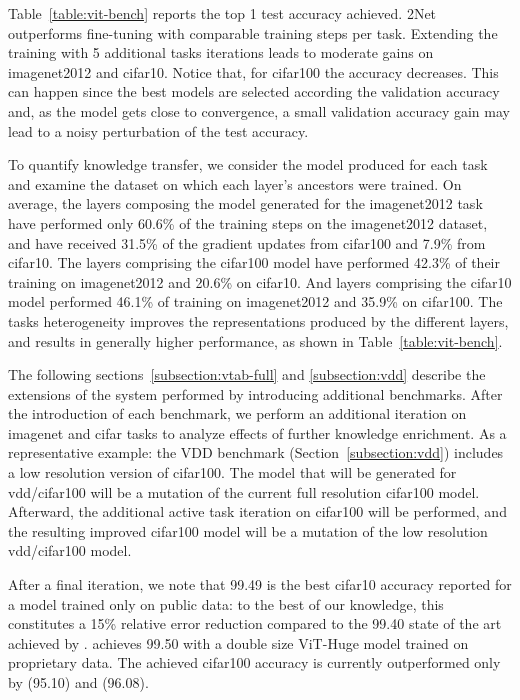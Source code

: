 \documentclass{article} \usepackage{iclr2023_conference,times}
\newcommand{\muNet}{2Net\xspace}
\begin{document}
Table~\ref{table:vit-bench} reports the top 1 test accuracy achieved. \muNet outperforms fine-tuning with comparable training steps per task.
Extending the training with 5 additional tasks iterations leads to moderate gains on imagenet2012 and cifar10.
Notice that, for cifar100 the accuracy decreases.
This can happen since the best models are selected according the  validation accuracy and, as the model gets close to convergence, a small validation accuracy gain may lead to a noisy perturbation of the test accuracy.

To quantify knowledge transfer, we consider the model produced for each task and examine the dataset on which each layer's ancestors were trained.
On average, the layers composing the model generated for the imagenet2012 task have performed only 60.6\% of the training steps on the imagenet2012 dataset,
and have received 31.5\% of the gradient updates from cifar100 and 7.9\% from cifar10.
The layers comprising the cifar100 model have performed 42.3\% of their training on imagenet2012 and 20.6\% on cifar10.
And layers comprising the cifar10 model performed 46.1\% of training on imagenet2012 and 35.9\% on cifar100.
The tasks heterogeneity improves the representations produced by the different layers, and results in generally higher performance, as shown in Table~\ref{table:vit-bench}.

The following sections~\ref{subsection:vtab-full} and \ref{subsection:vdd} describe the extensions of the system performed by introducing additional benchmarks.
After the introduction of each benchmark, we perform an additional iteration on imagenet and cifar tasks to analyze effects of further knowledge enrichment.
As a representative example: the VDD benchmark (Section~\ref{subsection:vdd}) includes a low resolution version of cifar100. The model that will be generated for vdd/cifar100 will be a mutation of the current full resolution cifar100 model.
Afterward, the additional active task iteration on cifar100 will be performed, and the resulting improved cifar100 model will be a mutation of the low resolution vdd/cifar100 model.


After a final iteration, we note that 99.49 is the best cifar10 accuracy reported for a model trained only on public data: to the best of our knowledge, this constitutes a 15\% relative error reduction compared to the 99.40 state of the art achieved by \citet{Touvron2021GoingDW}.
\citet{Dosovitskiy2021AnII} achieves 99.50 with a double size ViT-Huge model trained on proprietary data.
The achieved cifar100 accuracy is currently outperformed only by  \citet{Ridnik2021MLDecoderSA} (95.10) and \citet{Foret2021SharpnessAwareMF} (96.08).
 
\end{document}
